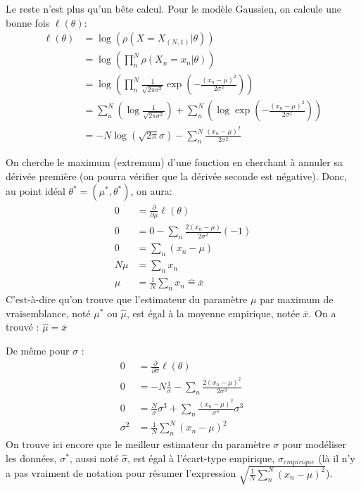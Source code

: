 \documentclass[french,twoside]{article}
\begin{document}
Le reste n'est plus qu'un bête calcul.
Pour le modèle Gaussien, on calcule une bonne fois $\ell(\theta)$:
\begin{align}
\ell(\theta) 
&=\log  \left(\rho(X= X_{(N,1)}|\theta)\right)
\\ 
&=\log  \left( \prod_n^N \rho(X_n=x_n|\theta) \right)
\\ 
&= \log \left( \prod_n^N \frac{1}{\sqrt{2\pi \sigma^2}} \exp\left( -\frac{(x_n-\mu)^2}{2\sigma^2}\right)  \right)
\\
&=  \sum_n^N \left( \log \frac{1}{\sqrt{2\pi \sigma^2}} \right) +  \sum_n^N \left( \log \exp\left( -\frac{(x_n-\mu)^2}{2\sigma^2}\right)  \right)
\\
&= - N \log ( \sqrt{2\pi} \sigma) - \sum_n^N \frac{(x_n-\mu)^2}{2\sigma^2}
\end{align}

On cherche le maximum (extremum) d'une fonction en cherchant à annuler sa dérivée première (on pourra vérifier que la dérivée seconde est négative).
Donc, au point idéal $\theta^*=(\mu^*, \theta^*)$, on aura:
\begin{align}
0 &= \frac{\partial}{\partial \mu} \ell(\theta) \\
0 &= 0 -  \sum_n \frac{2(x_n-\mu)}{2\sigma^2}(-1) \\
0 &=  \sum_n (x_n-\mu) \\ 
N \mu &= \sum_n x_n \\
\mu &= \frac1N \sum_n x_n \hat{=} \overline{x}
\end{align}
C'est-à-dire qu'on trouve que l'estimateur du paramètre $\mu$ par maximum de vraisemblance, noté $\mu^*$ ou $\hat{\mu}$, est égal à la moyenne empirique, notée $\overline{x}$. On a trouvé : $\hat{\mu}=\overline{x}$

De même pour $\sigma $ :
\begin{align}
0 &= \frac{\partial}{\partial \sigma} \ell(\theta) \\
0 &= -N\frac1\sigma -  \sum_n \frac{2(x_n-\mu)^2}{2\sigma^3} \\
0 &= \frac{N}{\sigma} \sigma^3 +\sum_n \frac{(x_n-\mu)^2}{\sigma^3} \sigma^3  \
\\
\sigma^2 &= \frac1N \sum_n^N(x_n-\mu)^2
\end{align}
On trouve ici encore que le meilleur estimateur du paramètre $\sigma$ pour modéliser les données, $\sigma^*$, aussi noté $\hat{\sigma}$, est égal à l'écart-type empirique, $\sigma_{empirique}$ (là il n'y a pas vraiment de notation pour résumer l'expression $\sqrt{ \frac1N \sum_n^N(x_n-\mu)^2}$).
\end{document}
